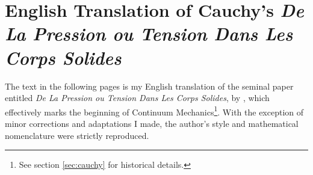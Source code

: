 \chapter{English Translation of Cauchy's \textit{De La Pression ou Tension Dans Les Corps Solides}}\label{ch:appA}

The text in the following pages is my English translation of the seminal paper entitled \textit{De La Pression ou Tension Dans Les Corps Solides}, by \cite{cauchySolid_1889}, which effectively marks the beginning of Continuum Mechanics\footnote{See section \ref{sec:cauchy} for historical details.}. With the exception of minor corrections and adaptations I made, the author's style and mathematical nomenclature were strictly reproduced. 


